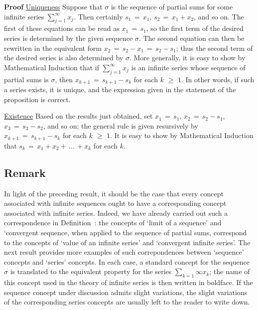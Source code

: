 \V

        {\bf Proof} \underline{Uniqueness} Suppose that ${\sigma}$ is the sequence of partial sums for some infinite series $\sum_{j=1}^{{\infty}} x_{j}$.
    Then certainly $s_{1} \,=\, x_{1}$, $s_{2} \,=\, x_{1}+x_{2}$, and so on.  The first of these equations can be read as $x_{1} \,=\, s_{1}$, so the first term of the desired series is determined by the given sequence ${\sigma}$.
    The second equation can then be rewritten in the equivalent form $x_{2} \,=\, s_{2}-x_{1} \,=\, s_{2}-s_{1}$;
    thus the second term of the desired series is also determined by ${\sigma}$.
    More generally, it is easy to show by Mathematical Induction that if $\sum_{j=1}^{{\infty}} x_{j}$ is an infinite series
    whose sequence of partial sums is ${\sigma}$, then $x_{k+1} \,=\, s_{k+1}-s_{k}$ for each $k\,\,{\geq}\,\,1$.
    In other words, if such a series exists, it is unique, and the expression given in the statement of the proposition is correct.

        \underline{Existence} Based on the results just obtained, set $x_{1} \,=\, s_{1}$, $x_{2} \,=\, s_{2}-s_{1}$, $x_{3} \,=\, s_{3}-s_{2}$, and so on;
    the general rule is given resursively by $x_{k+1} \,=\, s_{k+1}-s_{k}$ for each $k\,\,{\geq}\,\,1$.
    It is easy to show by Mathematical Induction that $s_{k} \,=\, x_{1}+x_{2}+\,{\ldots}\,+x_{k}$ for each $k$.

\V
\V

        \subsection{\small{{\bf Remark}}}
        \label{RemarkG30.50}

\V

        In light of the preceding result, it should be the case that every concept associated with infinite sequences ought to have a corresponding concept associated with infinite series.
    Indeed, we have already carried out such a correspondence in Definition~:
    the concepts of `limit of a sequence' and `convergent sequence, when applied to the sequence of partial sums, correspond to the concepts of `value of an infinite series' and `convergent infinite series'.
    The next result provides more examples of such correpondences between `sequence' concepts and `series' concepts.
    In each case, a standard concept for the sequence ${\sigma}$ is translated to the equivalent property for the series $\sum_{k=1}{\infty} x_{k}$;
    the name of this concept used in the theory of infinite series is then written in boldface.
    If the sequence concept under discussion admits slight variations, the slight variations of the corresponding series concepts are usually left to the reader to write down.

